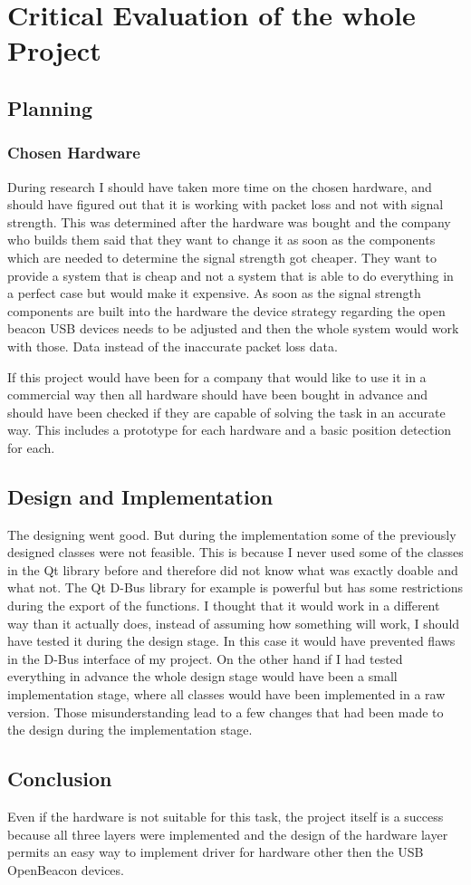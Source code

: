 \chapter[Critical Evaluation]{Critical Evaluation of the whole Project}
 \section{Planning}
  \subsection{Chosen Hardware}
   During research I should have taken more time on the chosen hardware, and should have figured out that it is working with packet loss and not with signal strength. This was determined after the hardware was bought and the company who builds them said that they want to change it as soon as the components which are needed to determine the signal strength got cheaper. They want to provide a system that is cheap and not a system that is able to do everything in a perfect case but would make it expensive. As soon as the signal strength components are built into the hardware the device strategy regarding the open beacon USB devices needs to be adjusted and then the whole system would work with those. Data instead of the inaccurate packet loss data.

   If this project would have been for a company that would like to use it in a commercial way then all hardware should have been bought in advance and should have been checked if they are capable of solving the task in an accurate way. This includes a prototype for each hardware and a basic position detection for each.

 \section{Design and Implementation}
  The designing went good. But during the implementation some of the previously designed classes were not feasible. This is because I never used some of the classes in the Qt library before and therefore did not know what was exactly doable and what not. The Qt D-Bus library for example is powerful but has some restrictions during the export of the functions. I thought that it would work in a different way than it actually does, instead of assuming how something will work, I should have tested it during the design stage. In this case it would have prevented flaws in the D-Bus interface of my project. On the other hand if I had tested everything in advance the whole design stage would have been a small implementation stage, where all classes would have been implemented in a raw version. Those misunderstanding lead to a few changes that had been made to the design during the implementation stage.

 \section{Conclusion}
  Even if the hardware is not suitable for this task, the project itself is a success because all three layers were implemented and the design of the hardware layer permits an easy way to implement driver for hardware other then the USB OpenBeacon devices.
